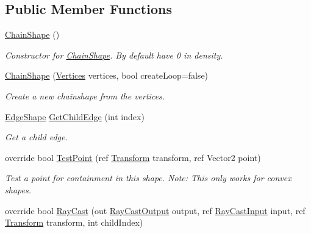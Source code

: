 \subsection*{Public Member Functions}
\begin{DoxyCompactItemize}
\item 
\hyperlink{class_farseer_physics_1_1_collision_1_1_shapes_1_1_chain_shape_aee16e64d49af2dcc5b5d2b6ce3457b46}{Chain\+Shape} ()
\begin{DoxyCompactList}\small\item\em Constructor for \hyperlink{class_farseer_physics_1_1_collision_1_1_shapes_1_1_chain_shape}{Chain\+Shape}. By default have 0 in density. \end{DoxyCompactList}\item 
\hyperlink{class_farseer_physics_1_1_collision_1_1_shapes_1_1_chain_shape_ac58577c737388f32d7ca9d2372b44b8e}{Chain\+Shape} (\hyperlink{class_farseer_physics_1_1_common_1_1_vertices}{Vertices} vertices, bool create\+Loop=false)
\begin{DoxyCompactList}\small\item\em Create a new chainshape from the vertices. \end{DoxyCompactList}\item 
\hyperlink{class_farseer_physics_1_1_collision_1_1_shapes_1_1_edge_shape}{Edge\+Shape} \hyperlink{class_farseer_physics_1_1_collision_1_1_shapes_1_1_chain_shape_aae9ce81f0fd250503f1dc26e6de54ea7}{Get\+Child\+Edge} (int index)
\begin{DoxyCompactList}\small\item\em Get a child edge. \end{DoxyCompactList}\item 
override bool \hyperlink{class_farseer_physics_1_1_collision_1_1_shapes_1_1_chain_shape_ae61a83dc7db45b85bf9e134bf7150ded}{Test\+Point} (ref \hyperlink{struct_farseer_physics_1_1_common_1_1_transform}{Transform} transform, ref Vector2 point)
\begin{DoxyCompactList}\small\item\em Test a point for containment in this shape. Note\+: This only works for convex shapes. \end{DoxyCompactList}\item 
override bool \hyperlink{class_farseer_physics_1_1_collision_1_1_shapes_1_1_chain_shape_a2a73fff5e7564fcfb49bff3cd4423b87}{Ray\+Cast} (out \hyperlink{struct_farseer_physics_1_1_collision_1_1_ray_cast_output}{Ray\+Cast\+Output} output, ref \hyperlink{struct_farseer_physics_1_1_collision_1_1_ray_cast_input}{Ray\+Cast\+Input} input, ref \hyperlink{struct_farseer_physics_1_1_common_1_1_transform}{Transform} transform, int child\+Index)

\end{DoxyCompactItemize}

